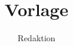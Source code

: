 \documentclass[8pt,a4paper]{scrartcl}
\title{Vorlage}
\author{Redaktion}
\newcommand{\topicolor}{white}
\newcommand{\topicategory}{}
\begin{document}
\maketitle
\tableofcontents
\newpage

\renewcommand{\topicolor}{iot}
\renewcommand{\topicategory}{Home Automation/Internet of Things}
\end{document}
